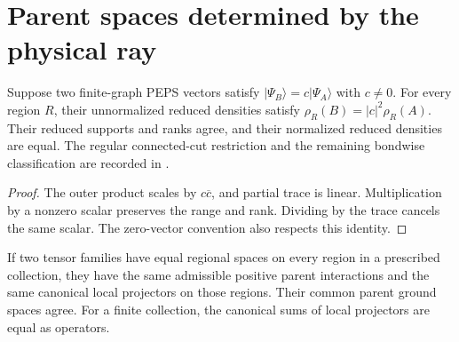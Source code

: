 \section{Parent spaces determined by the physical ray}%
\label{sec:peps_regular_state_parent_rigidity}

\begin{lemma}%
    \label{lem:peps_reduced_density_physical_ray}
    \leanok
    Suppose two finite-graph PEPS vectors satisfy
    $|\Psi_B\rangle=c|\Psi_A\rangle$ with $c\ne0$. For every
    region $R$, their unnormalized reduced densities satisfy
    $\rho_R(B)=|c|^2\rho_R(A)$. Their reduced supports and ranks
    agree, and their normalized reduced densities are equal.
    The regular connected-cut restriction and the remaining bondwise classification are recorded in
    \cite{gap:rmp_peps_quantum_double_g_isometry}.
\end{lemma}

\begin{proof}\leanok
    The outer product scales by $c\overline c$, and partial trace
    is linear. Multiplication by a nonzero scalar preserves the
    range and rank. Dividing by the trace cancels the same scalar.
    The zero-vector convention also respects this identity.
\end{proof}

\begin{lemma}%
    \label{lem:peps_parent_operators_local_spaces}
    \leanok
    If two tensor families have equal regional spaces on every
    region in a prescribed collection, they have the same
    admissible positive parent interactions and the same
    canonical local projectors on those regions. Their common
    parent ground spaces agree. For a finite collection, the
    canonical sums of local projectors are equal as operators.
\end{lemma}

